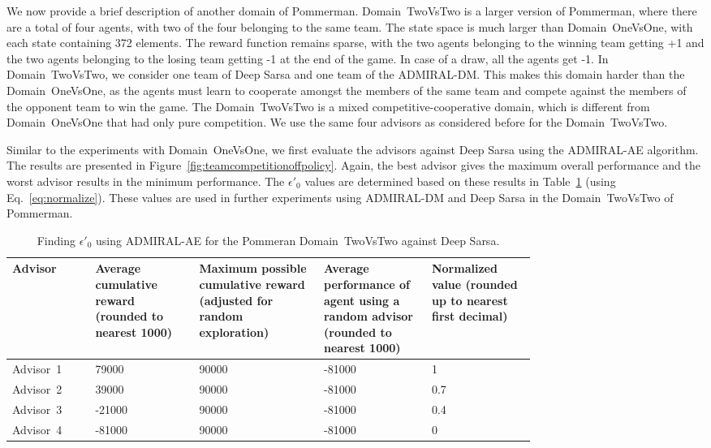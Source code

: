 \documentclass[jair, twoside,11pt,theapa]{article}
\begin{document}
We  now provide a brief description of another domain of Pommerman. Domain~TwoVsTwo is a larger version of Pommerman, where there are a total of four agents, with two of the four belonging to the same team. The state space is much larger than Domain~OneVsOne, with each state containing 372 elements. The reward function remains sparse, with the two agents belonging to the winning team getting +1 and the two agents belonging to the losing team getting -1 at the end of the game. In case of a draw, all the agents get -1. In Domain~TwoVsTwo, we consider one team of Deep Sarsa and one team of the ADMIRAL-DM. This makes this domain harder than the Domain~OneVsOne, as the agents must learn to cooperate amongst the members of the same team and compete against the members of the opponent team to win the game.  The Domain~TwoVsTwo is a mixed competitive-cooperative domain, which is different from Domain~OneVsOne that had only pure competition. We  use the same four advisors as considered before for the Domain~TwoVsTwo. 


 Similar to the experiments with Domain~OneVsOne, we first evaluate the advisors against Deep Sarsa using the ADMIRAL-AE algorithm. The results are presented in Figure~\ref{fig:teamcompetitionoffpolicy}. Again, the best advisor gives the maximum overall performance and the worst advisor results in  the minimum performance.  The $\epsilon'_0$ values are determined based on these results in Table~\ref{tab:pommermanteamcompetitionvsdeepsarsaepsilon} (using Eq.~\ref{eq:normalize}). These values are used in further experiments using ADMIRAL-DM and Deep Sarsa in the Domain~TwoVsTwo of Pommerman. 


\begin{table}[h]
\begin{center}
  \begin{tabular}{||p{0.12 \linewidth} |p{0.15 \linewidth} |p{0.18 \linewidth} |p{0.15 \linewidth} | p{0.15 \linewidth}||} 
 \hline
 Advisor & Average cumulative reward (rounded to nearest 1000) & Maximum possible cumulative reward (adjusted for random exploration) & Average performance of agent using a random advisor (rounded to nearest 1000) & Normalized value (rounded up to nearest first decimal)\\ [0.5ex]
 \hline\hline
 Advisor~1 & 79000 & 90000 & -81000 & 1 \\ 
 \hline
 Advisor~2 & 39000 & 90000 & -81000 & 0.7 \\
 \hline
 Advisor~3 & -21000 & 90000 & -81000 & 0.4  \\
 \hline
 Advisor~4 & -81000 & 90000 & -81000 & 0  \\[1ex] 
 \hline
\end{tabular}
\caption{Finding $\epsilon'_0$ using ADMIRAL-AE for the Pommeran Domain~TwoVsTwo against Deep Sarsa.}
\label{tab:pommermanteamcompetitionvsdeepsarsaepsilon}
\end{center}
\end{table}
\end{document}
